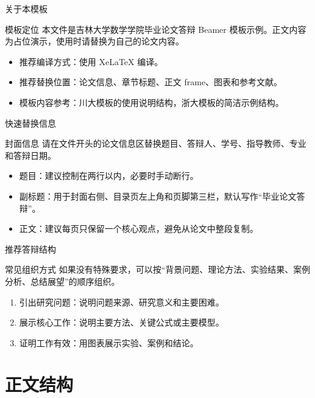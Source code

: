 \documentclass[12pt,aspectratio=43]{beamer}
\newcommand{\JLUEmph}[1]{{\JLUHei #1}}
\newcommand{\JLUSectionTitleTwo}{正文结构}
\begin{document}
\begin{frame}{关于本模板}
  \begin{block}{模板定位}
    本文件是吉林大学数学学院毕业论文答辩 Beamer 模板示例。正文内容为占位演示，使用时请替换为自己的论文内容。
  \end{block}

  \begin{itemize}
    \item 推荐编译方式：使用 XeLaTeX 编译。
    \item 推荐替换位置：论文信息、章节标题、正文 frame、图表和参考文献。
    \item 模板内容参考：川大模板的使用说明结构，浙大模板的简洁示例结构。
  \end{itemize}
\end{frame}

\begin{frame}{快速替换信息}
  \begin{block}{封面信息}
    请在文件开头的论文信息区替换题目、答辩人、学号、指导教师、专业和答辩日期。
  \end{block}

  \begin{itemize}
    \item \JLUEmph{题目}：建议控制在两行以内，必要时手动断行。
    \item \JLUEmph{副标题}：用于封面右侧、目录页左上角和页脚第三栏，默认写作“毕业论文答辩”。
    \item \JLUEmph{正文}：建议每页只保留一个核心观点，避免从论文中整段复制。
  \end{itemize}
\end{frame}

\begin{frame}{推荐答辩结构}
  \begin{block}{常见组织方式}
    如果没有特殊要求，可以按“背景问题、理论方法、实验结果、案例分析、总结展望”的顺序组织。
  \end{block}

  \begin{enumerate}
    \item 引出研究问题：说明问题来源、研究意义和主要困难。
    \item 展示核心工作：说明主要方法、关键公式或主要模型。
    \item 证明工作有效：用图表展示实验、案例和结论。
  \end{enumerate}
\end{frame}

\section{\JLUSectionTitleTwo}
\end{document}

